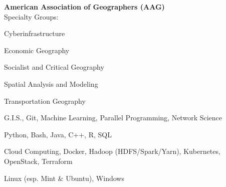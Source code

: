 \documentclass{acmresume}
\begin{document}
    


    \textbf{American Association of Geographers (AAG)} \\
    Specialty Groups: \\ \vspace{-.3cm}
    \begin{multicols}{3}
    \begin{titemize}
        \item Cyberinfrastructure
        \item Economic Geography
        \item Socialist and Critical Geography
        \item Spatial Analysis and Modeling
        \item Transportation Geography
    \end{titemize}
    \end{multicols}
	\vspace{0.25cm}
	
	
	
	
	\vspace{0.25cm}

	
	\begin{description}[topsep=0pt,itemsep=1pt]
		 G.I.S., Git, Machine Learning, Parallel Programming, Network Science
		
		 Python, Bash, Java, C++, R, SQL
		
		 Cloud Computing, Docker, Hadoop (HDFS/Spark/Yarn), Kubernetes, OpenStack, Terraform
		
		 Linux (esp. Mint \& Ubuntu), Windows
	\end{description}
\end{document}
